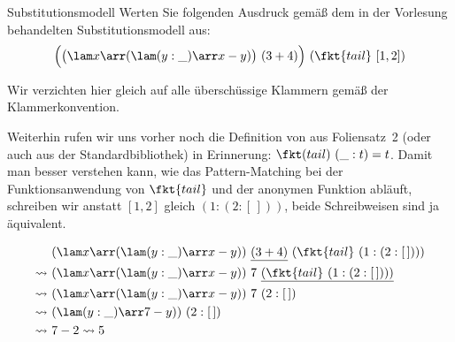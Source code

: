 \documentclass[11pt]{article}
\begin{document}
\begin{aufgabe}{Substitutionsmodell}\label{Substitutionsmodell1}
  Werten Sie folgenden Ausdruck gemäß dem in der Vorlesung behandelten Substitutionsmodell
  aus:
    $$\Bigl(\bigl(\lam x \arr (\lam (y:\_) \arr x-y)\bigr)\ (3+4)\Bigr)\ (\fkt{tail}\ [1,2])$$
    
\begin{loesung}
  Wir verzichten hier gleich auf alle überschüssige Klammern gemäß der Klammerkonvention.
  
  Weiterhin rufen wir uns vorher noch 
  die Definition von  aus Foliensatz~2 (oder auch aus der Standardbibliothek)
  in Erinnerung: $\fkt(tail)\ (\_:t) = t$.
  Damit man besser verstehen kann, wie das Pattern-Matching bei der Funktionsanwendung
  von $\fkt{tail}$ und der anonymen Funktion abläuft,
  schreiben wir anstatt $[1,2]$ gleich $(1:(2:[\,]))$,
  beide Schreibweisen sind ja äquivalent.
  
 \begin{align*}
                & (\lam x \arr (\lam (y:\_) \arr x-y))\ \underline{(3+4)}\ (\fkt{tail}\ (1:(2:[\,]))) 
    \\\leadsto~ & (\lam x \arr (\lam (y:\_) \arr x-y))\ 7\ \underline{(\fkt{tail}\ (1:(2:[\,])))}
    \\\leadsto~ & (\lam x \arr (\lam (y:\_) \arr x-y))\ 7\ (2:[\,])
    \\\leadsto~ & (\lam (y:\_) \arr 7-y))\ (2:[\,])
    \\\leadsto~ & 7-2 \leadsto 5
 \end{align*}
\end{loesung}
    
\end{aufgabe}
\end{document}
